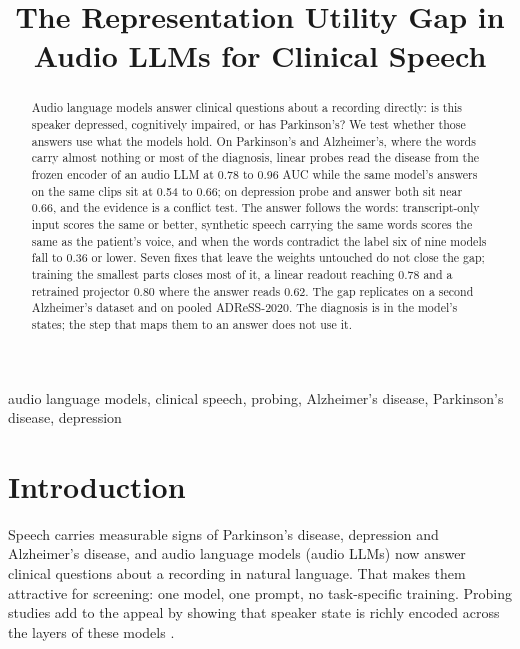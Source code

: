 \documentclass[conference]{IEEEtran}
\begin{document}
\title{The Representation Utility Gap in Audio LLMs for Clinical Speech}

\author{
}

\maketitle

\begin{abstract}
Audio language models answer clinical questions about a recording directly: is this speaker
depressed, cognitively impaired, or has Parkinson's? We test whether those answers use what the
models hold. On Parkinson's and Alzheimer's, where the words carry almost nothing or most of the
diagnosis, linear probes read the disease from the frozen encoder of an audio LLM at 0.78 to 0.96 AUC
while the same model's answers on the same clips sit at 0.54 to 0.66; on depression probe and answer
both sit near 0.66, and the evidence is a conflict test. The answer follows the words:
transcript-only input scores the same or better, synthetic speech carrying the same words scores the
same as the patient's voice, and when the words contradict the label six of nine models fall to 0.36
or lower. Seven fixes that leave the weights untouched do not close the gap; training the smallest
parts closes most of it, a linear readout reaching 0.78 and a retrained projector 0.80 where the
answer reads 0.62. The gap replicates on a second Alzheimer's dataset and on pooled ADReSS-2020. The
diagnosis is in the model's states; the step that maps them to an answer does not use it.
\end{abstract}

\begin{IEEEkeywords}
audio language models, clinical speech, probing, Alzheimer's disease, Parkinson's disease, depression
\end{IEEEkeywords}

\section{Introduction}\label{sec:intro}

Speech carries measurable signs of Parkinson's disease, depression and Alzheimer's disease, and
audio language models (audio LLMs) now answer clinical questions about a recording in natural
language. That makes them attractive for screening: one model, one prompt, no task-specific
training. Probing studies add to the appeal by showing that speaker state is richly encoded across
the layers of these models \cite{probing}.
\end{document}
